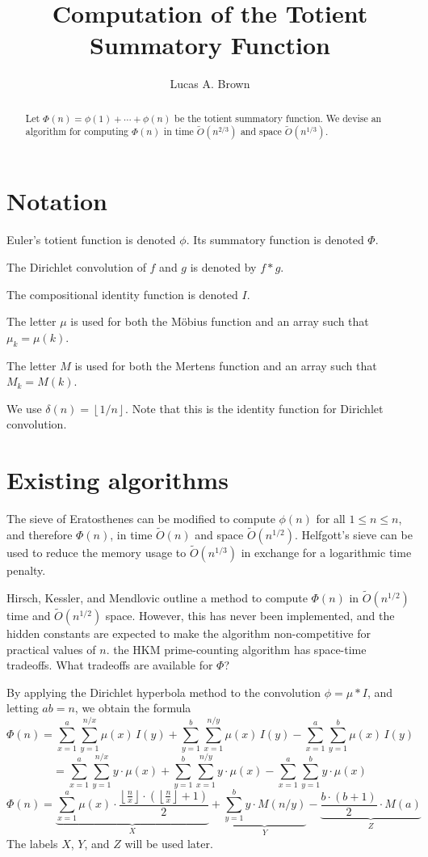 \documentclass[12pt]{article}
\title{Computation of the Totient Summatory Function}
\author{Lucas A. Brown}
\date{\currentdatetime}
\newcommand{\eqn}[1]{\begin{displaymath} #1 \end{displaymath}}
\newcommand{\neqn}[1]{\begin{equation} #1 \end{equation}}
\newcommand{\floor}[1]{{\left\lfloor #1 \right\rfloor}}
\newcommand{\floordiv}[2]{\floor{\frac{#1}{#2}}}
\begin{document}
\maketitle %

\begin{abstract}
Let $\Phi(n) = \phi(1) + \cdots + \phi(n)$ be the totient summatory function.  We devise an algorithm for computing $\Phi(n)$ in time $\widetilde{O}(n^{2/3})$ and space $\widetilde{O}(n^{1/3})$.
\end{abstract}

\section{Notation}

Euler's totient function is denoted $\phi$.  Its summatory function is denoted $\Phi$.

The Dirichlet convolution of $f$ and $g$ is denoted by $f*g$.

The compositional identity function is denoted $I$.

The letter $\mu$ is used for both the M\"{o}bius function and an array such that $\mu_k = \mu(k)$.

The letter $M$ is used for both the Mertens function and an array such that $M_k = M(k)$.

We use $\delta(n) = \floor{1/n}$.  Note that this is the identity function for Dirichlet convolution.

\section{Existing algorithms}

The sieve of Eratosthenes can be modified to compute $\phi(n)$ for all $1 \leq n \leq n$, and therefore $\Phi(n)$, in time $\widetilde{O}(n)$ and space $\widetilde{O}(n^{1/2})$.  Helfgott's sieve \cite{Helfgott2020} can be used to reduce the memory usage to $\widetilde{O}(n^{1/3})$ in exchange for a logarithmic time penalty.

Hirsch, Kessler, and Mendlovic outline \cite[\S5.6]{HKM2024} a method to compute $\Phi(n)$ in $\widetilde{O}(n^{1/2})$ time and $\widetilde{O}(n^{1/2})$ space.  However, this has never been implemented, and the hidden constants are expected to make the algorithm non-competitive for practical values of $n$.  \todo the HKM prime-counting algorithm has space-time tradeoffs.  What tradeoffs are available for $\Phi$?

By applying the Dirichlet hyperbola method to the convolution $\phi = \mu * I$, and letting $ab=n$, we obtain the formula
\eqn{\Phi(n) = \sum_{x=1}^{a}\sum_{y=1}^{n/x} \mu(x) \, I(y) + \sum_{y=1}^{b}\sum_{x=1}^{n/y} \mu(x) \, I(y) - \sum_{x=1}^{a}\sum_{y=1}^{b} \mu(x) \, I(y)}
\eqn{ = \sum_{x=1}^{a}\sum_{y=1}^{n/x} y \cdot \mu(x) + \sum_{y=1}^{b}\sum_{x=1}^{n/y} y \cdot \mu(x) - \sum_{x=1}^{a}\sum_{y=1}^{b} y \cdot \mu(x)}
\neqn{\Phi(n) = \underbrace{\sum_{x=1}^{a} \mu(x) \cdot \frac{\floordiv{n}{x} \cdot \left(\floordiv{n}{x} + 1\right)}{2}}_{X} + \underbrace{\sum_{y=1}^{b} y \cdot M(n/y)}_{Y} - \underbrace{\frac{b \cdot (b+1)}{2} \cdot M(a)}_{Z} \label{PhiFormula}}
The labels $X$, $Y$, and $Z$ will be used later.
\end{document}
